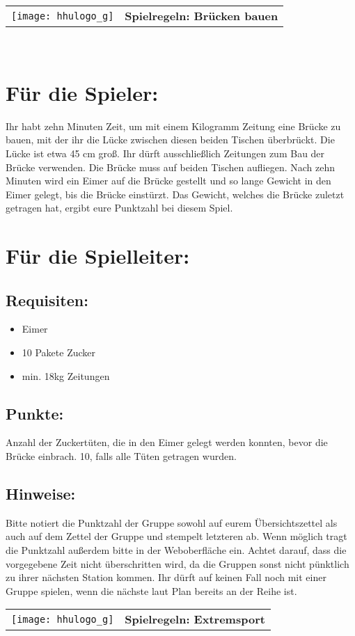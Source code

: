 \documentclass[a4paper,10pt]{article}
\def\spiela{Brücken bauen}
\def\spielb{Extremsport}
\newcommand{\unten}{
 Bitte notiert die Punktzahl der Gruppe sowohl auf eurem Übersichtszettel als auch auf dem Zettel der Gruppe und stempelt letzteren ab. Wenn möglich tragt die Punktzahl außerdem bitte in der Weboberfläche ein.
 Achtet darauf, dass die vorgegebene Zeit nicht überschritten wird, da die Gruppen sonst nicht pünktlich zu ihrer nächsten Station kommen. Ihr dürft auf keinen Fall noch mit einer Gruppe spielen, wenn die nächste laut Plan bereits an der Reihe ist.
}
\begin{document}

  \begin{tabularx}{\textwidth}{lc}
    \texttt{[image: hhulogo\_g]}
  & {\Huge \textbf{Spielregeln: \spiela}}
  \end{tabularx}\\

\Large
\section*{Für die Spieler:} 
Ihr habt zehn Minuten Zeit, um mit einem Kilogramm Zeitung eine Brücke zu bauen, mit der ihr die Lücke zwischen diesen beiden Tischen überbrückt. Die Lücke ist etwa 45 cm groß. Ihr dürft ausschließlich Zeitungen zum Bau der Brücke verwenden. Die Brücke muss auf beiden Tischen aufliegen. Nach zehn Minuten wird ein Eimer auf die Brücke gestellt und so lange Gewicht in den Eimer gelegt, bis die Brücke einstürzt. Das Gewicht, welches die Brücke zuletzt getragen hat, ergibt eure Punktzahl bei diesem Spiel. 

\section*{Für die Spielleiter:}
\subsection*{Requisiten:}
\begin{itemize}
 \item Eimer
 \item 10 Pakete Zucker
 \item min. 18kg Zeitungen
\end{itemize}
\subsection*{Punkte:}
Anzahl der Zuckertüten, die in den Eimer gelegt werden konnten, bevor die Brücke einbrach. 10, falls alle Tüten getragen wurden.

\subsection*{Hinweise:}  
\unten

\newpage


  \begin{tabularx}{\textwidth}{lc}
    \texttt{[image: hhulogo\_g]}
  & {\Huge \textbf{Spielregeln: \spielb}}
  \end{tabularx}\\
\end{document}
